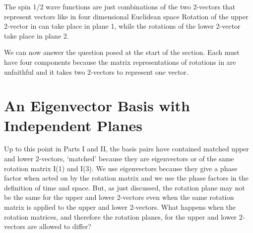\documentclass[a4paper,12pt]{article}
\begin{document}
	The spin 1/2 wave functions \myHighlight{$\psi$}\coordHE{} are just combinations of the two 2-vectors that represent vectors like \myHighlight{$\chi$}\coordHE{} in four dimensional Euclidean space \coordHE{}  Rotation of the upper 2-vector in \myHighlight{$\psi$}\coordHE{} can take place in plane 1, while the rotations of the lower 2-vector take place in plane 2. 

	We can now answer the question posed at the start of the section. Each \myHighlight{$\psi$}\coordHE{} must have four components because the \coordHE{} matrix representations of rotations in \coordHE{} are unfaithful and it takes two 2-vectors to represent one vector.


\section{An Eigenvector Basis with Independent Planes} \label{sectionortho}%

	Up to this point in Parts I and II, the basis pairs have contained matched upper and lower 2-vectors, `matched' because they are eigenvectors \coordHE{} or \coordHE{} of the same rotation matrix \coordHE{} I(1) and I(3). We use eigenvectors because they give a phase factor when acted on by the rotation matrix and we use the phase factors in the definition of time and space. But, as just discussed, the rotation plane may not be the same for the upper and lower 2-vectors even when the same rotation matrix \coordHE{} is applied to the upper and lower 2-vectors. What happens when the rotation matrices, and therefore the rotation planes, for the upper and lower 2-vectors are allowed to differ? 
\end{document}
